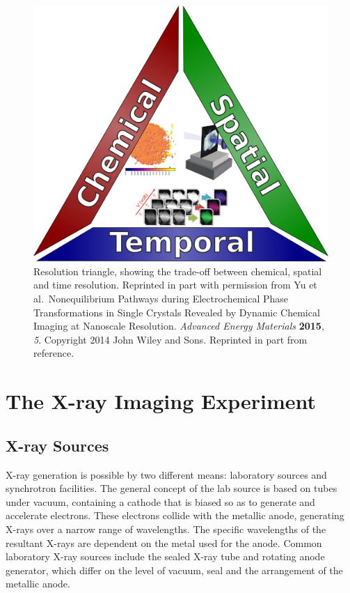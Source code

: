 \documentclass[journal=cmatex,manuscript=perspective]{achemso}
\begin{document}
\begin{figure}
  \includegraphics[width=\textwidth]{resolution-triangle.png}
  \caption{Resolution triangle, showing the trade-off between
    chemical, spatial and time resolution. Reprinted in part with
    permission from Yu et al.\ Nonequilibrium Pathways during
    Electrochemical Phase Transformations in Single Crystals Revealed
    by Dynamic Chemical Imaging at Nanoscale
    Resolution. \textit{Advanced Energy Materials} \textbf{2015},
    \textit{5}. Copyright 2014 John Wiley and Sons. Reprinted in part
    from reference\cite{shapiro2014}.}
  \label{figure:resolution-triangle}
\end{figure}

\section{The X-ray Imaging Experiment}

\subsection{X-ray Sources}

X-ray generation is possible by two different means: laboratory
sources and synchrotron facilities. The general
concept of the lab source is based on tubes under vacuum, containing a
cathode that is biased so as to generate and accelerate
electrons. These electrons collide with the metallic anode, generating
X-rays over a narrow range of wavelengths. The specific wavelengths of
the resultant X-rays are dependent on the metal used for the
anode. Common laboratory X-ray sources include the sealed X-ray tube
and rotating anode generator, which differ on the level of vacuum,
seal and the arrangement of the metallic anode\cite{guinebretiere}.
\end{document}
